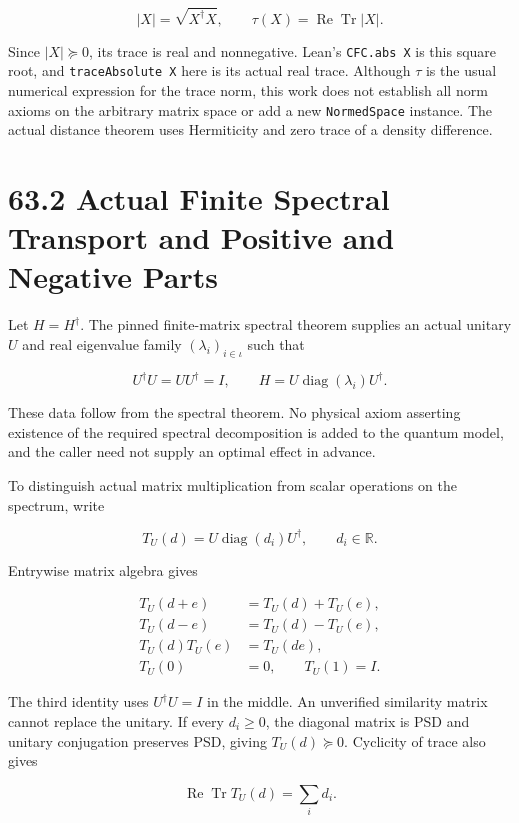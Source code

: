\documentclass[
  11pt,
  oneside]{book}
\begin{document}
\[
|X|=\sqrt{X^\dagger X},
\qquad
\tau(X)=\operatorname{Re}\operatorname{Tr}|X|.
\]

Since \(|X|\succeq0\), its trace is real and nonnegative. Lean's
\texttt{CFC.\allowbreak abs\ X} is this square root, and \texttt{trace\allowbreak Absolute\ X}
here is its actual real trace. Although \(\tau\) is the usual numerical
expression for the trace norm, this work does not establish all norm
axioms on the arbitrary matrix space or add a new \texttt{Normed\allowbreak Space}
instance. The actual distance theorem uses Hermiticity and zero trace of
a density difference.

\section{63.2 Actual Finite Spectral Transport and Positive and Negative
Parts}

Let \(H=H^\dagger\). The pinned finite-matrix spectral theorem supplies
an actual unitary \(U\) and real eigenvalue family
\((\lambda_i)_{i\in\iota}\) such that

\[
U^\dagger U=UU^\dagger=I,
\qquad
H=U\operatorname{diag}(\lambda_i)U^\dagger.
\]

These data follow from the spectral theorem. No physical axiom asserting
existence of the required spectral decomposition is added to the quantum
model, and the caller need not supply an optimal effect in advance.

To distinguish actual matrix multiplication from scalar operations on
the spectrum, write

\[
T_U(d)=U\operatorname{diag}(d_i)U^\dagger,
\qquad d_i\in\mathbb R.
\]

Entrywise matrix algebra gives

\[
\begin{aligned}
T_U(d+e)&=T_U(d)+T_U(e),\\
T_U(d-e)&=T_U(d)-T_U(e),\\
T_U(d)T_U(e)&=T_U(de),\\
T_U(0)&=0,\qquad T_U(1)=I.
\end{aligned}
\]

The third identity uses \(U^\dagger U=I\) in the middle. An unverified
similarity matrix cannot replace the unitary. If every \(d_i\ge0\), the
diagonal matrix is PSD and unitary conjugation preserves PSD, giving
\(T_U(d)\succeq0\). Cyclicity of trace also gives

\[
\operatorname{Re}\operatorname{Tr}T_U(d)=\sum_i d_i.
\]
\end{document}
